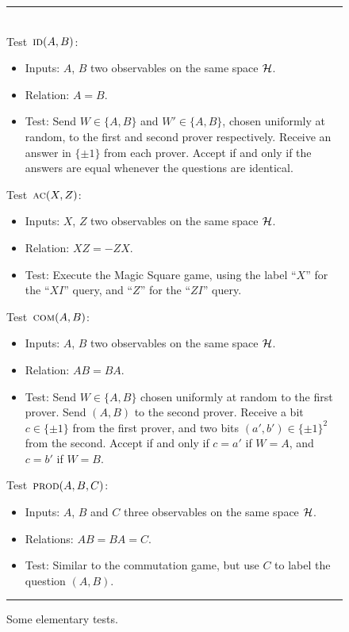 \begin{figure}[H]
\rule[1ex]{16.5cm}{0.5pt}\\
\justifying
Test~$\textsc{id}(A,B)$:
\begin{itemize}
    \item Inputs: $A$, $B$ two observables on the same space $\mathcal{H}$.
    \item Relation: $A=B$.
    \item Test: Send $W \in \{A,B\}$ and $W'\in\{A,B\}$, chosen uniformly at random, to the first and second prover respectively. Receive an answer in $\{\pm 1\}$ from each prover. Accept if and only if the answers are equal whenever the questions are identical. 
\end{itemize}

Test~$\textsc{ac}(X,Z)$:
\begin{itemize}
    \item Inputs: $X$, $Z$ two observables on the same space $\mathcal{H}$.
    \item Relation: $XZ=-ZX$.
    \item Test: Execute the Magic Square game, using the label ``$X$'' for the ``$XI$'' query, and ``$Z$'' for the ``$ZI$'' query.  
\end{itemize}

Test~$\textsc{com}(A,B)$:
\begin{itemize}
    \item Inputs: $A$, $B$ two observables on the same space $\mathcal{H}$.
    \item Relation: $AB=BA$.
    \item Test: Send $W\in\{A,B\}$ chosen uniformly at random to the first prover. Send $(A,B)$ to the second prover. Receive a bit $c\in\{\pm 1\}$ from the first prover, and two bits $(a',b')\in\{\pm 1\}^2$ from the second. Accept if and only if $c=a'$ if $W=A$, and $c=b'$ if $W=B$. 
\end{itemize}

Test~$\textsc{prod}(A,B,C)$:
\begin{itemize}
    \item Inputs: $A$, $B$ and $C$ three observables on the same space $\mathcal{H}$.
    \item Relations: $AB=BA=C$.
    \item Test: Similar to the commutation game, but use $C$ to label the question $(A,B)$.
\end{itemize}
\rule[2ex]{16.5cm}{0.5pt}\vspace{-.5cm}
\caption{Some elementary tests.}
\label{fig:elementary}
\end{figure}

